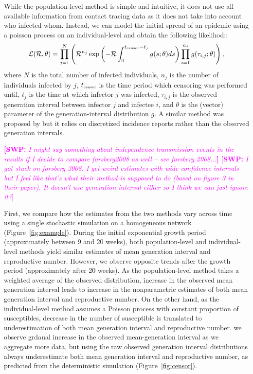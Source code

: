 \documentclass[12pt]{article}
\newcommand{\RR}{\ensuremath{{\mathcal R}}}
\newcommand{\tsub}[2]{#1_{{\textrm{\tiny #2}}}}
\newcommand{\comment}[3]{\textcolor{#1}{\textbf{[#2: }\textsl{#3}\textbf{]}}}
\newcommand{\swp}[1]{\comment{magenta}{SWP}{#1}}
\begin{document}
While the population-level method is simple and intuitive, it does not use all available information from contact tracing data as it does not take into account who infected whom.
Instead, we can model the initial spread of an epidemic using a poisson process on an individual-level and obtain the following likelihod::
\begin{equation}
\mathcal{L}(\RR, \theta) = \prod_{j=1}^N \left(\RR^{n_j} \exp \left(- \RR \int_0^{\tsub{t}{censor} - t_j} g(s;\theta) ds \right) \prod_{i=1}^{n_j} g(\tau_{i, j}; \theta) \right),
\end{equation}
where $N$ is the total number of infected individuals, $n_j$ is the number of individuals infected by $j$, $\tsub{t}{censor}$ is the time period which censoring was performed until, $t_j$ is the time at which infector $j$ was infected, $\tau_{i,j}$ is the observed generation interval between infector $j$ and infectee $i$, and $\theta$ is the (vector) parameter of the generation-interval distribution $g$.
A similar method was proposed by \cite{forsberg2008likelihood} but it relies on discretized incidence reports rather than the observed generation intervals.

\swp{I might say something about independence transmission events in the results if I decide to compare forsberg2008 as well -- see forsberg 2008...}
\swp{I got stuck on forsberg 2008. I get weird estimates with wide confidence intervals but I feel like that's what their method is supposed to do (based on figure 3 in their paper). It doesn't use generation interval either so I think we can just ignore it?}

First, we compare how the estimates from the two methods vary across time using a single stochastic simulation on a homogeneous network (Figure~\ref{fig:example}).
During the initial exponential growth period (approximately between 9 and 20 weeks), both population-level and individual-level methods yield similar estimates of mean generation interval and reproductive number.
However, we observe opposite trends after the growth period (approximately after 20 weeks).
As the population-level method takes a weighted average of the observed distribution, increase in the observed mean generation interval leads to increase in the nonparametric estimates of both mean generation interval and reproductive number.
On the other hand, as the individual-level method assumes a Poisson process with constant proportion of susceptibles, decrease in the number of susceptible is translated to underestimation of both mean generation interval and reproductive number.
we observe grdaual increase in the observed mean-generation interval as we aggregate more data, but using the raw observed generation interval distributions always underestimate both mean generation interval and reproductive number, as predicted from the deterministic simulation (Figure~\ref{fig:censor}).
\end{document}
